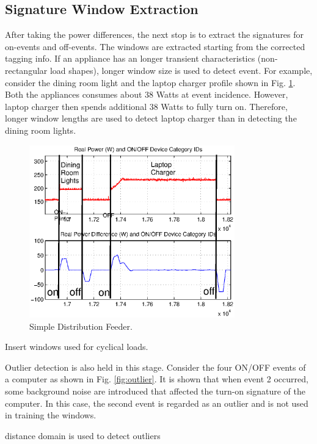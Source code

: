 \documentclass[conference]{IEEEtran}
\begin{document}
\subsection{Signature Window Extraction}
After taking the power differences, the next stop is to extract the signatures for on-events and off-events. The windows are extracted starting from the corrected tagging info.  If an appliance has an longer transient characteristics (non-rectangular load shapes), longer window size is used to detect event.  For example, consider the dining room light and the laptop charger profile shown in Fig. \ref{fig:windowlength}.  Both the appliances consumes about 38 Watts at event incidence.  However, laptop charger then spends additional 38 Watts to fully turn on.  Therefore, longer window lengths are used to detect laptop charger than in detecting the dining room lights. 

\begin{figure}[!t]
	\centering
	\includegraphics[width=3.5in]{fig/windowlength.eps}
	\caption{Simple Distribution Feeder.}
	\label{fig:windowlength}
\end{figure}

Insert windows used for cyclical loads.

Outlier detection is also held in this stage.  Consider the four ON/OFF events of a computer as shown in Fig. \ref{fig:outlier}.  It is shown that when event 2 occurred, some background noise are introduced that affected the turn-on signature of the computer.  In this case, the second event is regarded as an outlier and is not used in training the windows.

distance domain is used to detect outliers
\end{document}
